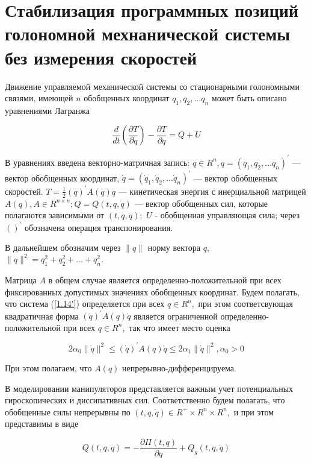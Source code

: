 \section{Стабилизация программных позиций голономной мехнанической системы без измерения скоростей} \label{p12}

Движение управляемой механической системы со стационарными голономными связями, имеющей $n$ обобщенных координат $q_1, q_2, ... q_n$ может быть описано уравнениями Лагранжа 

\begin{equation} \label{1.14'}
\frac{d}{dt} (\frac{\partial T}{\partial \dot q}) - \frac{\partial T}{\partial q} = Q + U
\end{equation}

 В уравнениях введена векторно-матричная запись: $q \in R^n, q = (q_1, q_2, ... q_n)^{'}$ --- вектор обобщенных координат, $\dot q = (\dot q_1, \dot q_2, ... \dot q_n)^{'}$ --- вектор обобщенных скоростей. $T = \frac{1}{2} (\dot q)^{'} A(q) \dot q$ --- кинетическая энергия с инерциальной матрицей $A(q), A \in R^{n \times n};  Q = Q(t, q, \dot q)$ --- вектор обобщенных сил, которые полагаются зависимыми от $(t, q, \dot q);$ $U$ - обобщенная управляющая сила; через $( )^{'}$ обозначена операция транспонирования. 

В дальнейшем обозначим через $\| q \|$ норму вектора $q$, $\|q\|^{2} = q_1^2 + q_2^2 + ... + q_n^2.$

Матрица $A$ в общем случае является определенно-положительной при всех фиксированных допустимых значениях обобщенных координат. Будем полагать, что система (\ref{1.14'}) определяется при всех $q \in R^n,$ при этом соответсвующая квадратичная форма $(\dot q)^{'} A(q) \dot q$ является ограниченной определенно-положительной при всех $q \in R^n,$ так что имеет место оценка 

\begin{equation} \label{1.15'}
2 \alpha_0 \| \dot q \|^2 \le (\dot q)^{'} A(q) \dot q \le 2 \alpha_1 \| \dot q \|^2, \alpha_0 > 0
\end{equation}

При этом полагаем, что $A(q)$ непрерывно-дифференцируема.

В моделировании манипуляторов представляется важным учет потенциальных гироскопических и диссипативных сил. Соответственно будем полагать, что обобщенные силы непрерывны по $(t, q, \dot q) \in R^{+} \times R^{n} \times R^{n},$ и при этом представимы в виде

\begin{equation} \label{1.16'}
Q(t, q, \dot q) = -\frac{\partial \Pi (t, q)}{\partial q} + Q_g (t, q, \dot q)
\end{equation}

